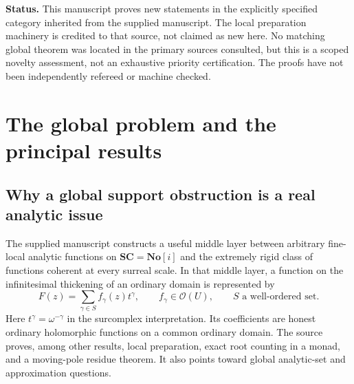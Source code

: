 \documentclass[11pt,letterpaper]{article}
\theoremstyle{definition}
\theoremstyle{remark}
\newcommand{\C}{\mathbb C}
\newcommand{\N}{\mathbb N}
\newcommand{\Z}{\mathbb Z}
\newcommand{\No}{\mathbf{No}}
\newcommand{\SC}{\mathbf{SC}}
\newcommand{\OO}{\mathcal O}
\numberwithin{equation}{section}
\begin{document}
\begin{titlepage}
\begin{minipage}{0.93\textwidth}
\begin{abstract}
For additive Cousin data on a puncture-and-disk cover, we identify the complete obstruction: the exponents carrying nonremovable ordinary coefficient singularities must form a well-ordered set. This yields explicit injections of $\C^{\N}/\C^{(\N)}$ into first cohomology and into the group of locally free rank-one Hahn-coherent line bundles. That line-bundle group on the ordinary plane vanishes exactly when the exponent group is trivial or ordered-isomorphic to $\Z$. In every other case it contains continuum many linearly independent classes under its natural additive description. The proofs are support-controlled constructions, not convergence arguments in the fine surreal topology.
\end{abstract}
\end{minipage}
\vfill
\begin{minipage}{0.93\textwidth}\small
\textbf{Status.} This manuscript proves new statements in the explicitly specified category inherited from the supplied manuscript. The local preparation machinery is credited to that source, not claimed as new here. No matching global theorem was located in the primary sources consulted, but this is a scoped novelty assessment, not an exhaustive priority certification. The proofs have not been independently refereed or machine checked.
\end{minipage}
\end{titlepage}
\hypersetup{pageanchor=true}
{\small\tableofcontents}
\newpage
{}

\section{The global problem and the principal results}\label{sec:introduction}

\subsection{Why a global support obstruction is a real analytic issue}
The supplied manuscript \cite{Supplied} constructs a useful middle layer between arbitrary fine-local analytic functions on $\SC=\No[i]$ and the extremely rigid class of functions coherent at every surreal scale. In that middle layer, a function on the infinitesimal thickening of an ordinary domain is represented by
\[
 F(z)=\sum_{\gamma\in S}f_\gamma(z)t^\gamma,
 \qquad f_\gamma\in\OO(U),
 \qquad S\text{ a well-ordered set}.
\]
Here $t^\gamma=\omega^{-\gamma}$ in the surcomplex interpretation. Its coefficients are honest ordinary holomorphic functions on a common ordinary domain. The source proves, among other results, local preparation, exact root counting in a monad, and a moving-pole residue theorem. It also points toward global analytic-set and approximation questions.
\end{document}
